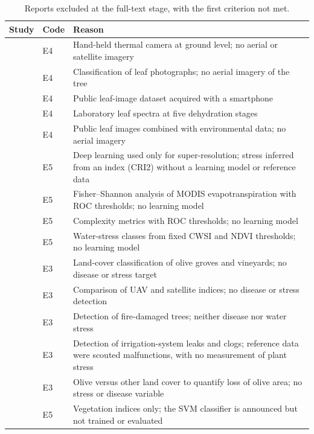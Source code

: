\documentclass[preprint,12pt]{elsarticle}
\begin{document}
\begin{table}[H]\centering\footnotesize
\caption{Reports excluded at the full-text stage, with the first criterion not met.}\label{tab:excluded}
\begin{tabular}{@{}L{3.74cm}L{0.87cm}L{7.83cm}@{}}\toprule
Study & Code & Reason\\\midrule
\citet{u025} & E4 & Hand-held thermal camera at ground level; no aerial or satellite imagery\\
\citet{u090} & E4 & Classification of leaf photographs; no aerial imagery of the tree\\
\citet{u058} & E4 & Public leaf-image dataset acquired with a smartphone\\
\citet{u136} & E4 & Laboratory leaf spectra at five dehydration stages\\
\citet{u141} & E4 & Public leaf images combined with environmental data; no aerial imagery\\
\citet{u027} & E5 & Deep learning used only for super-resolution; stress inferred from an index (CRI2) without a learning model or reference data\\
\citet{u078} & E5 & Fisher--Shannon analysis of MODIS evapotranspiration with ROC thresholds; no learning model\\
\citet{u128} & E5 & Complexity metrics with ROC thresholds; no learning model\\
\citet{quillemamani2026systematic} & E5 & Water-stress classes from fixed CWSI and NDVI thresholds; no learning model\\
\citet{cilli2023tebaka} & E3 & Land-cover classification of olive groves and vineyards; no disease or stress target\\
\citet{alfonso2025hybrid} & E3 & Comparison of UAV and satellite indices; no disease or stress detection\\
\citet{u073} & E3 & Detection of fire-damaged trees; neither disease nor water stress\\
\citet{u029} & E3 & Detection of irrigation-system leaks and clogs; reference data were scouted malfunctions, with no measurement of plant stress\\
\citet{majikumna2024random} & E3 & Olive versus other land cover to quantify loss of olive area; no stress or disease variable\\
\citet{navrozidis2020assessing} & E5 & Vegetation indices only; the SVM classifier is announced but not trained or evaluated\\\bottomrule
\end{tabular}\end{table}
 
\end{document}
